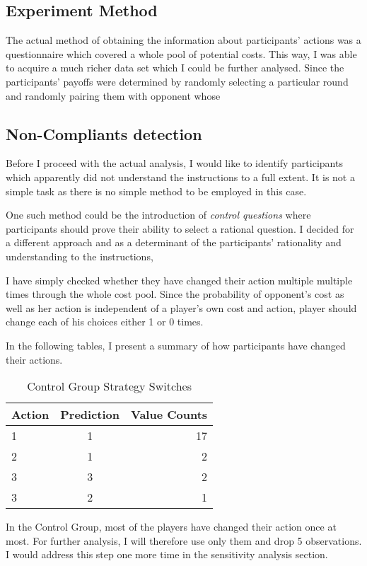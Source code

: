 \documentclass[
  digital, %
  twoside, %
  lof,     %
  lot,     %
]{fithesis4}
\begin{document}
\subsection{Experiment Method}
The actual method of obtaining the information about participants' actions was a questionnaire which covered a whole pool of potential costs. This way, I was able to acquire a much richer data set which I could be further analysed. Since the participants' payoffs were determined by randomly selecting a particular round and randomly pairing them with opponent whose 

\subsection{Non-Compliants detection}
Before I proceed with the actual analysis, I would like to identify participants which apparently did not understand the instructions to a full extent. It is not a simple task as there is no simple method to be employed in this case.
\par
One such method could be the introduction of \emph{control questions} where participants should prove their ability to select a rational question. I decided for a different approach and as a determinant of the participants' rationality and understanding to the instructions, \par
I have simply checked whether they have changed their action multiple multiple times through the whole cost pool. Since the probability of opponent's cost as well as her action is independent of a player's own cost and action, player should change each of his choices either 1 or 0 times. 



In the following tables, I present a summary of how participants have changed their actions.

\begin{table}
\centering
\begin{tabular}{lcr}
\hline
Action & Prediction & Value Counts \\
\hline
1 & 1 & 17 \\
2 & 1 & 2 \\
3 & 3 & 2 \\
3 & 2 & 1 \\
\hline
\end{tabular}
\caption{Control Group Strategy Switches}
\end{table}

In the Control Group, most of the players have changed their action once at most. For  further analysis, I will therefore use only them and drop 5 observations. I would address this step one more time in the sensitivity analysis section. 
\end{document}

